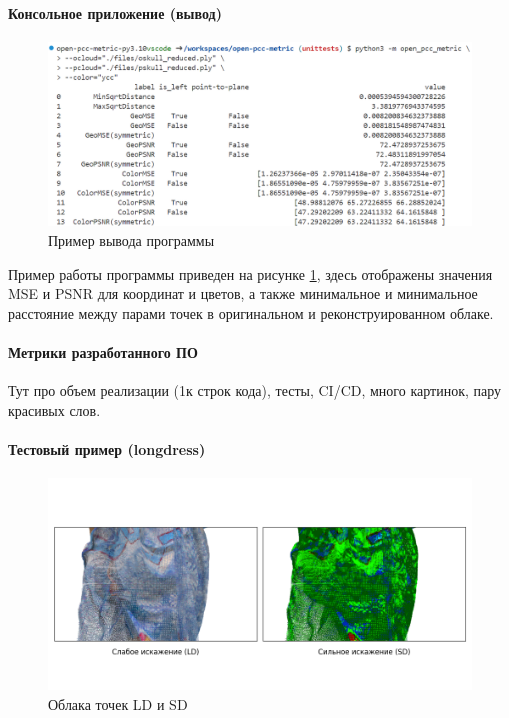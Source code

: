 \documentclass[a4paper,12pt]{extreport}
\begin{document}
\paragraph{Консольное приложение (вывод)}

\begin{figure}[H]
    \centering
    \includegraphics[width=0.7\linewidth]{assets/open_pcc_metric_output.png}
    \caption{Пример вывода программы}
    \label{img:pcc_metric_output}
\end{figure}

Пример работы программы приведен на рисунке \ref{img:pcc_metric_output}, здесь
отображены значения MSE и PSNR для координат и цветов, а также минимальное и
минимальное расстояние между парами точек в оригинальном и реконструированном
облаке.

\paragraph{Метрики разработанного ПО}

Тут про объем реализации (1к строк кода), тесты, CI/CD, много картинок, пару
красивых слов.

\paragraph{Тестовый пример (longdress)}

\begin{figure}[H]
    \centering
    \includegraphics[width=0.7\linewidth]{assets/distorted_plot.png}
    \caption{Облака точек LD и SD}
    \label{img:longdress_dist}
\end{figure}
\end{document}

